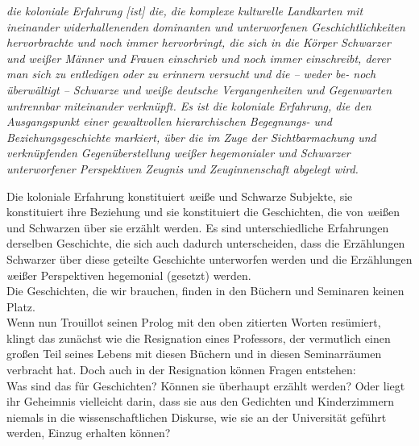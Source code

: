 \begin{myenv}
  \textit{\glqq[…] die koloniale Erfahrung [ist] die, die komplexe kulturelle
    Landkarten mit ineinander widerhallenenden dominanten und unterworfenen
    Geschichtlichkeiten hervorbrachte und noch immer hervorbringt, die sich in
    die Körper Schwarzer und weißer Männer und Frauen einschrieb und noch immer
    einschreibt, derer man sich zu entledigen oder zu erinnern versucht und die
    – weder be- noch überwältigt – Schwarze und weiße deutsche Vergangenheiten
    und Gegenwarten untrennbar miteinander verknüpft. Es ist die koloniale
    Erfahrung, die den Ausgangspunkt einer gewaltvollen hierarchischen
    Begegnungs- und Beziehungsgeschichte markiert, über die im Zuge der
    Sichtbarmachung und verknüpfenden Gegenüberstellung weißer hegemonialer und
    Schwarzer unterworfener Perspektiven Zeugnis und Zeuginnenschaft abgelegt
  wird.\grqq\footnotemark{}} \end{myenv}
Die koloniale Erfahrung konstituiert \textit{w}eiße und Schwarze Subjekte, sie
konstituiert ihre Beziehung und sie konstituiert die Geschichten, die von
\textit{w}eißen und Schwarzen über sie erzählt werden. Es sind unterschiedliche
Erfahrungen derselben Geschichte, die sich auch dadurch unterscheiden, dass die
Erzählungen Schwarzer über diese geteilte Geschichte unterworfen werden und die
Erzählungen \textit{w}eißer Perspektiven hegemonial (gesetzt) werden.\\

\noindent Die Geschichten, die wir brauchen, finden in den Büchern und Seminaren keinen
Platz.\\
Wenn nun Trouillot seinen Prolog mit den oben zitierten Worten resümiert,
klingt das zunächst wie die Resignation eines Professors, der vermutlich einen
großen Teil seines Lebens mit diesen Büchern und in diesen Seminarräumen
verbracht hat. Doch auch in der Resignation können Fragen entstehen:\\
 Was sind
das für Geschichten? Können sie überhaupt erzählt werden? Oder liegt ihr
Geheimnis vielleicht darin, dass sie aus den Gedichten und Kinderzimmern
niemals in die wissenschaftlichen Diskurse, wie sie an der Universität geführt
werden, Einzug erhalten können?\\

